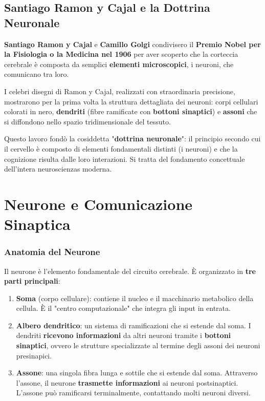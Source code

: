 \subsection{Santiago Ramon y Cajal e la Dottrina Neuronale}

\textbf{Santiago Ramon y Cajal} e \textbf{Camillo Golgi} condivisero il \textbf{Premio Nobel per la Fisiologia o la Medicina nel 1906} per aver scoperto che la corteccia cerebrale è composta da semplici \textbf{elementi microscopici}, i neuroni, che comunicano tra loro.

I celebri disegni di Ramon y Cajal, realizzati con straordinaria precisione, mostrarono per la prima volta la struttura dettagliata dei neuroni: corpi cellulari colorati in nero, \textbf{dendriti} (fibre ramificate con \textbf{bottoni sinaptici}) e \textbf{assoni} che si diffondono nello spazio tridimensionale del tessuto.

Questo lavoro fondò la cosiddetta "\textbf{dottrina neuronale}": il principio secondo cui il cervello è composto di elementi fondamentali distinti (i neuroni) e che la cognizione risulta dalle loro interazioni. Si tratta del fondamento concettuale dell'intera neuroscienzas moderna.

\newpage
\section{Neurone e Comunicazione Sinaptica}

\subsubsection{Anatomia del Neurone}

Il neurone è l'elemento fondamentale del circuito cerebrale. È organizzato in \textbf{tre parti principali}:

\begin{enumerate}
    \item \textbf{Soma} (corpo cellulare): contiene il nucleo e il macchinario metabolico della cellula. È il "centro computazionale" che integra gli input in entrata.
    \item \textbf{Albero dendritico}: un sistema di ramificazioni che si estende dal soma. I dendriti \textbf{ricevono informazioni} da altri neuroni tramite i \textbf{bottoni sinaptici}, ovvero le strutture specializzate al termine degli assoni dei neuroni presinapici.
    \item \textbf{Assone}: una singola fibra lunga e sottile che si estende dal soma. Attraverso l'assone, il neurone \textbf{trasmette informazioni} ai neuroni postsinaptici. L'assone può ramificarsi terminalmente, contattando molti neuroni diversi.
\end{enumerate}


